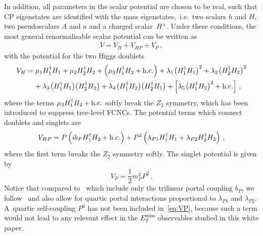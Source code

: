 \documentclass[a4paper, 11pt,notoc]{article}
\newcommand{\MET}{\ensuremath{E_T^\mathrm{miss}}\xspace}
\begin{document}
In addition, all parameters in the scalar potential are chosen to be real, such that CP eigenstates are identified with the mass eigenstates,~i.e.~two scalars $h$ and $H$, two pseudoscalars $A$ and $a$ and a charged scalar~$H^\pm$. Under these conditions, the most general renormalisable scalar potential can be written as 
\begin{align} \label{eq:V2HDMa}
V=V_H+V_{HP}+V_P\,,
\end{align}
with the potential for the two Higgs doublets
\begin{equation}\label{eq:VH}
\begin{split}
V_{H} & = \mu_1 H_1^\dagger H_1 + \mu_2 H_2^\dagger H_2 + \left ( \mu_3  H_1^\dagger H_2 + {\rm h.c.} \right ) + \lambda_1  \hspace{0.25mm} \big ( H_1^\dagger H_1  \big )^2  + \lambda_2  \hspace{0.25mm} \big ( H_2^\dagger H_2 \big  )^2  \\
& \phantom{xx} +  \lambda_3 \hspace{0.25mm} \big ( H_1^\dagger H_1  \big ) \big ( H_2^\dagger H_2  \big ) + \lambda_4  \hspace{0.25mm} \big ( H_1^\dagger H_2  \big ) \big ( H_2^\dagger H_1  \big ) + \left [ \lambda_5   \hspace{0.25mm} \big ( H_1^\dagger H_2 \big )^2 + {\rm h.c.} \right ]  \,,
\end{split}
\end{equation}
where the terms $\mu_3  H_1^\dagger H_2 + {\rm h.c.}$  softly break the  $Z_2$ symmetry, which has been introduced to suppress tree-level FCNCs. The potential terms which connect doublets and singlets are 
\begin{equation} \label{eq:VHP}
\begin{split}
V_{HP}  = P \left ( i  b_P   H_1^\dagger H_2 + {\rm h.c.} \right ) + P^2 \left (  \lambda_{P1}  H_1^\dagger H_1 +   \lambda_{P2}    H_2^\dagger H_2 \right )  \,,
\end{split} 
\end{equation}
where the first term breaks the  $Z_2$ symmetry softly.  The singlet potential is given by 
\begin{equation} \label{eq:VP}
V_{P}  =  \frac{1}{2}  m_P^2  P^2  \,.
\end{equation}
Notice  that compared to~\cite{Ipek:2014gua,No:2015xqa,Goncalves:2016iyg,Tunney:2017yfp} which include only the trilinear portal coupling $b_P$, we  follow~\cite{Bauer:2017ota} and also allow for quartic portal interactions proportional to $\lambda_{P1}$ and  $\lambda_{P2}$. A~quartic self-coupling $P^4$ has not been included in~\eqref{eq:VP}, because such a term would not lead to any relevant effect in the $\MET$ observables studied in this white paper.
\end{document}
